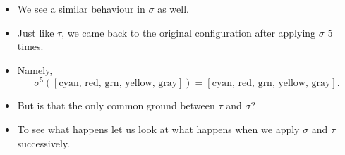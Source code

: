 \documentclass[ %
 10pt, xcolor={dvipsnames,svgnames,x11names,hyperref},
   hyperref={colorlinks=true,citecolor=green,linkcolor=DarkRed,urlcolor=ProcessBlue,anchorcolor=blue}
  ]{beamer}
\newenvironment{stepitemize}{\begin{itemize}[<+->]}{\end{itemize} }
\begin{document}
\begin{frame}
\begin{stepitemize}
    \item We see a similar behaviour in $\sigma$ as well.
    \item Just like $\tau$, we came back to the original configuration after applying $\sigma $ $5$ times.
    \item Namely, 
$$\sigma^5([\textrm{cyan, red, grn, yellow, gray}]) = [\textrm{cyan, red, grn, yellow, gray}].$$
    \item But is that the only common ground between $\tau$ and $\sigma$?
    \item To see what happens let us look at what happens when we apply $\sigma$ and $\tau$ successively.
\end{stepitemize}
    
\end{frame}
\end{document}
